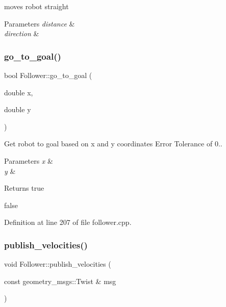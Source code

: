 moves robot straight 


\begin{DoxyParams}{Parameters}
{\em distance} & \\
\hline
{\em direction} & \\
\hline
\end{DoxyParams}
\mbox{\label{class_follower_a08ab05cb32f0e6653939163dd22f344a}} 
\subsubsection{\texorpdfstring{go\+\_\+to\+\_\+goal()}{go\_to\_goal()}}
{\footnotesize\ttfamily bool Follower\+::go\+\_\+to\+\_\+goal (\begin{DoxyParamCaption}\item[{double}]{x,  }\item[{double}]{y }\end{DoxyParamCaption})}



Get robot to goal based on x and y coordinates Error Tolerance of 0.. 


\begin{DoxyParams}{Parameters}
{\em x} & \\
\hline
{\em y} & \\
\hline
\end{DoxyParams}
\begin{DoxyReturn}{Returns}
true 

false 
\end{DoxyReturn}


Definition at line 207 of file follower.\+cpp.

\mbox{\label{class_follower_aaae1600959a929c269d557d9c09ba777}} 
\subsubsection{\texorpdfstring{publish\+\_\+velocities()}{publish\_velocities()}}
{\footnotesize\ttfamily void Follower\+::publish\+\_\+velocities (\begin{DoxyParamCaption}\item[{const geometry\+\_\+msgs\+::\+Twist \&}]{msg }\end{DoxyParamCaption})}



